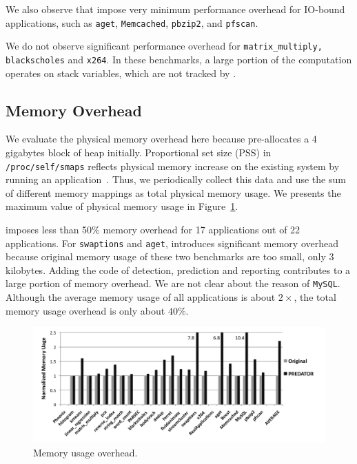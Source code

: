 We also observe that \Predator{} impose very minimum performance overhead for IO-bound applications, such as \texttt{aget}, \texttt{Memcached}, \texttt{pbzip2}, and \texttt{pfscan}.  

We do not observe significant performance overhead for \texttt{matrix\_multiply, blackscholes} and 
\texttt{x264}. In these benchmarks, a large portion of the computation operates on stack variables, which are not tracked by \Predator{}. 

\subsection{Memory Overhead}
\label{sec:memoverhead}
We evaluate the physical memory overhead here because \Predator{} pre-allocates a 4 gigabytes block of heap initially. Proportional set size (PSS) in \texttt{/proc/self/smaps} reflects physical memory increase on the existing system by running an application~\cite{memusage}. Thus, we periodically collect this data and use the sum of different memory mappings as total physical memory usage. We presents the maximum value of physical memory usage in Figure~\ref{fig:memusage}. 

\Predator{} imposes less than 50\% memory overhead for 17 applications out of 22 applications.  For \texttt{swaptions} and \texttt{aget}, \Predator{} introduces significant memory overhead because original memory usage of these two benchmarks are too small, only $3$ kilobytes. Adding the code of detection, prediction and reporting contributes to a large portion of memory overhead. We are not clear about the reason of \texttt{MySQL}. Although the average memory usage of all applications is about $2\times$, the total memory usage overhead is only about $40\%$. 

\begin{figure}
\begin{center} 
\includegraphics[width=6.5in]{fig/memusage}
\end{center}
\caption{Memory usage overhead.}
\label{fig:memusage}
\end{figure}


